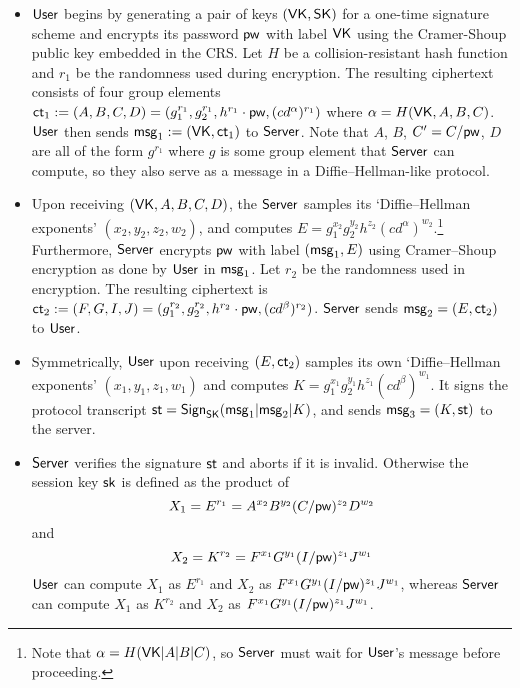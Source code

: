 \begin{itemize}
	\item $\mathsf{User}$ begins by generating a pair of keys $(\mathsf{VK},\mathsf{SK})$ for a one-time signature scheme and encrypts its password $\mathsf{pw}$ with label $\mathsf{VK}$ using the Cramer-Shoup public key embedded in the CRS. Let $H$ be a collision-resistant hash function and $r_1$ be the randomness used during encryption. The resulting ciphertext consists of four group elements $\mathsf{ct}_1 := (A,B,C,D) = (g_1^{r_1}, g_2^{r_1}, h^{r_1} \cdot\mathsf{pw}, (cd^\alpha)^{r_1})$ where $\alpha = H(\mathsf{VK}, A, B, C)$. $\mathsf{User}$ then sends $\mathsf{msg}_{1} := (\mathsf{VK}, \mathsf{ct}_1)$ to $\mathsf{Server}$. Note that $A$, $B$, $C' = C/\mathsf{pw}$, $D$ are all of the form $g^{r_1}$ where $g$ is some group element that $\mathsf{Server}$ can compute, so they also serve as a message in a Diffie--Hellman-like protocol.
	
	\item Upon receiving $(\mathsf{VK},A,B,C,D)$, the $\mathsf{Server}$ samples its `Diffie--Hellman exponents' $(x_2, y_2, z_2, w_2)$, and computes $E = g_1^{x_2}g_2^{y_2}h^{z_2}(cd^\alpha)^{w_2}$.\footnote{Note that $\alpha = H(\mathsf{VK}|A|B|C)$, so $\mathsf{Server}$ must wait for $\mathsf{User}$'s message before proceeding.} Furthermore, $\mathsf{Server}$ encrypts $\mathsf{pw}$ with label $(\mathsf{msg}_{1}, E)$ using Cramer--Shoup encryption as done by $\mathsf{User}$ in $\mathsf{msg}_{1}$. Let $r_2$ be the randomness used in encryption. The resulting ciphertext is $\mathsf{ct}_2:=(F,G,I,J) = (g_1^{r_2}, g_2^{r_2}, h^{r_2} \cdot\mathsf{pw}, (cd^\beta)^{r_2})$. $\mathsf{Server}$ sends $\mathsf{msg}_{2} = (E,\mathsf{ct}_2)$ to $\mathsf{User}$.
	
	\item Symmetrically, $\mathsf{User}$ upon receiving $(E,\mathsf{ct}_2)$ samples its own `Diffie--Hellman exponents' $(x_1,y_1,z_1,w_1)$ and computes $K = g_1^{x_1}g_2^{y_1}h^{z_1}(cd^\beta)^{w_1}$. It signs the protocol transcript $\mathsf{st} = \mathsf{Sign}_{\mathsf{SK}}(\mathsf{msg}_{1}|\mathsf{msg}_{2}|K)$, and sends $\mathsf{msg}_{3} = (K, \mathsf{st})$ to the server.
	
	\item $\mathsf{Server}$ verifies the signature $\mathsf{st}$ and aborts if it is invalid. Otherwise the session key $\mathsf{sk}$ is defined as the product of
	\[
	X_1 = E^{r_1} = A^{x_2}B^{y_2}(C/\mathsf{pw})^{z_2}D^{w_2}
	\]
	and
	\[
	X_2 = K^{r_2} = F^{x_1}G^{y_1}(I/\mathsf{pw})^{z_1}J^{w_1}
	\]
	$\mathsf{User}$ can compute $X_1$ as $E^{r_1}$ and $X_2$ as $F^{x_1}G^{y_1}(I/\mathsf{pw})^{z_1}J^{w_1}$, whereas $\mathsf{Server}$ can compute $X_1$ as $K^{r_2}$ and $X_2$ as $F^{x_1}G^{y_1}(I/\mathsf{pw})^{z_1}J^{w_1}$.
\end{itemize}


